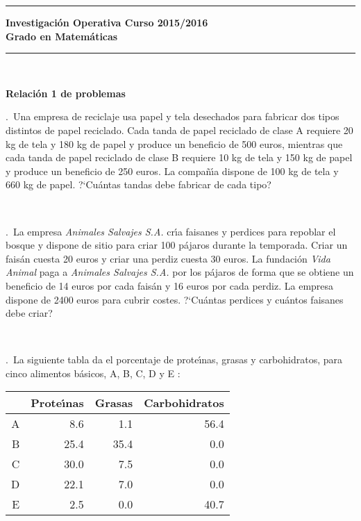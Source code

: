 \documentclass[11pt,a4paper,twoside]{article}
\newcounter{problem} \setcounter{problem}{1}
\newcommand{\ex}{\noindent {\sf \bf \theproblem}\addtocounter{problem}{1}.\ }
\begin{document}



\hrule
\bigskip
\textbf{Investigación Operativa   \hfill Curso 2015/2016\\
Grado en Matemáticas}
\bigskip
\hrule

\


\begin{center}  {\bf \large
Relaci\'{o}n 1 de problemas}
\end{center}
\bigskip


\ex Una empresa de reciclaje usa papel y tela
desechados para fabricar dos tipos distintos de papel
reciclado. Cada tanda de papel reciclado de clase A
requiere 20 kg de tela y 180 kg de papel y produce un beneficio
de 500 euros, mientras que
cada tanda de papel reciclado de clase B requiere 10 kg
de tela y 150 kg de papel y produce un beneficio
de 250 euros. La compa\~n\'{\i}a dispone de 100 kg
de tela y 660 kg de papel. ?`Cu\'antas tandas debe fabricar
de cada tipo?

\

\ex La empresa {\it Animales Salvajes S.A.} cr\'{\i}a faisanes y
perdices para repoblar el bosque y dispone de sitio para
criar 100 p\'ajaros durante la temporada. Criar un fais\'an
cuesta 20 euros y criar una perdiz cuesta 30 euros. La
fundaci\'on {\it Vida Animal} paga a {\it Animales Salvajes
S.A.} por los p\'ajaros de forma que se obtiene un beneficio
de 14 euros por cada fais\'an y 16 euros por cada perdiz. La
empresa dispone de 2400 euros para cubrir costes. ?`Cu\'antas
perdices y cu\'antos faisanes debe criar?

\

\ex    La siguiente tabla da el porcentaje de prote\'{\i}nas, grasas y
carbohidratos, para cinco alimentos
b\'asicos, A, B, C, D y E :



\begin{center}
\begin{tabular}{r|r|r|r}
 & Prote\'{\i}nas & Grasas & Carbohidratos \\ \hline 
A&8.6&1.1&56.4\\
B&25.4&35.4&0.0\\ C&30.0&7.5&0.0\\ D&22.1&7.0&0.0\\ E&2.5&0.0&40.7\\
\end{tabular}
\end{center}
\end{document}

